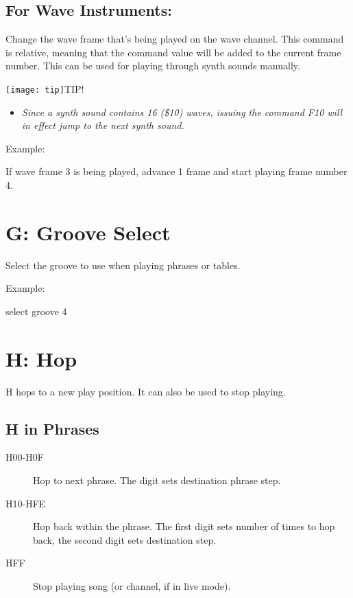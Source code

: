 \subsection{For Wave Instruments:}
Change the wave frame that's being played on the wave channel. This command is relative, meaning that the command value will be added to the current frame number. This can be used for playing through synth sounds manually.

\texttt{[image: tip]}TIP!
\begin{itemize}
        \item \textit{Since a synth sound contains 16 (\$10) waves, issuing the command \textsc{F10} will in effect jump to the next synth sound.}
	\end{itemize}

\begin{description}
\item Example:
\item[F01] If wave frame 3 is being played, advance 1 frame and start playing frame number 4.
\end{description}

\section{G: Groove Select}

Select the groove to use when playing phrases or tables.

\begin{description}
\item Example:
\item[G04] select groove 4
\end{description}

\section{H: Hop}

H hops to a new play position. It can also be used to stop playing.

\subsection{H in Phrases}

\begin{description}
    \item[H00-H0F] Hop to next phrase. The digit sets destination phrase step.
    \item[H10-HFE] Hop back within the phrase. The first digit sets number of times to hop back, the second digit sets destination step.
    \item[HFF] Stop playing song (or channel, if in live mode).
\end{description}

